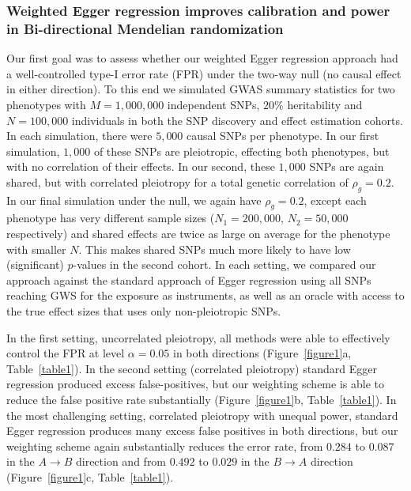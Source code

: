 \documentclass{article}
\begin{document}
\subsubsection*{Weighted Egger regression improves calibration and power in Bi-directional Mendelian randomization}
Our first goal was to assess whether our weighted Egger regression approach
had a well-controlled type-I error rate (FPR) under the two-way null (no causal effect in either direction). To this
end we simulated GWAS summary statistics for two phenotypes with $M=1,000,000$
independent SNPs, $20\%$ heritability and $N = 100,000$ individuals in both
 the SNP discovery and effect estimation cohorts. In each simulation, there
 were $5,000$ causal
SNPs per phenotype. In our first simulation, $1,000$ of these SNPs are pleiotropic,
effecting both phenotypes, but with no correlation of their effects. In our
second, these $1,000$ SNPs are again shared, but with correlated pleiotropy 
for a total genetic correlation of $\rho_g = 0.2$. In our final simulation under the
null, we again have $\rho_g = 0.2$, except each phenotype has very different sample sizes
($N_1 = 200,000$, $N_2 = 50,000$ respectively) and shared effects are twice as large on average
for the phenotype with smaller $N$. This makes shared SNPs much more likely to have
low (significant) $p$-values in the second cohort. In each setting, we compared our approach
against the standard approach of Egger regression using all SNPs reaching GWS for
 the exposure as instruments, as well as an oracle with access to the true
effect sizes that uses only non-pleiotropic SNPs.

In the first setting, uncorrelated pleiotropy, all methods were able to 
effectively control the FPR at level $\alpha = 0.05$ in both directions
(Figure~\ref{figure1}a, Table~\ref{table1}).
In the second setting (correlated pleiotropy)
standard Egger regression produced excess false-positives, but our weighting
scheme is able to reduce the false positive rate substantially
(Figure~\ref{figure1}b, Table~\ref{table1}).  In the most challenging setting,
correlated pleiotropy with unequal power, standard Egger regression produces
many excess false positives in both directions, but our weighting scheme
again substantially reduces the error rate, from $0.284$ to $0.087$ in
the $A\rightarrow B$ direction and from $0.492$ to $0.029$ in the 
$B\rightarrow A$ direction (Figure~\ref{figure1}c, Table~\ref{table1}).
\end{document}

